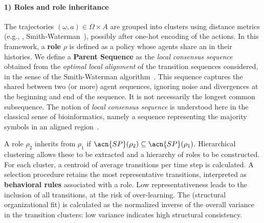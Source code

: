 \begin{itemize}
        \paragraph{1) Roles and role inheritance}
        The trajectories $(\omega, a) \in \Omega \times A$ are grouped into clusters using distance metrics (e.g., , Smith-Waterman~\cite{smith1981identification}), possibly after one-hot encoding of the actions.
        In this framework, a \textbf{role} $\rho$ is defined as a policy whose agents share an  in their histories.
        We define a \textbf{Parent Sequence} as the \textit{local consensus sequence} obtained from the \textit{optimal local alignment} of the transition sequences considered, in the sense of the Smith-Waterman algorithm~\cite{smith1981identification}.
        This sequence captures the  shared between two (or more) agent sequences, ignoring noise and divergences at the beginning and end of the sequence.
        It is not necessarily the longest common subsequence.
        The notion of \textit{local consensus sequence} is understood here in the classical sense of bioinformatics, namely a sequence representing the majority symbols in an aligned region~\cite{meshConsensusSequence,sternke2020consensus,schneider1990sequence}.

        A role $\rho_2$ inherits from $\rho_1$ if $\acn{SP}(\rho_2) \subseteq \acn{SP}(\rho_1)$.
        Hierarchical clustering allows these  to be extracted and a hierarchy of roles to be constructed.
        For each cluster, a centroid of average transitions per time step is calculated. A selection procedure retains the most representative transitions, interpreted as \textbf{behavioral rules} associated with a role.
        Low representativeness leads to the inclusion of all transitions, at the risk of over-learning.
        The \textbf{} (structural organizational fit) is calculated as the normalized inverse of the overall variance in the transition clusters: low variance indicates high structural consistency.


\end{itemize}
